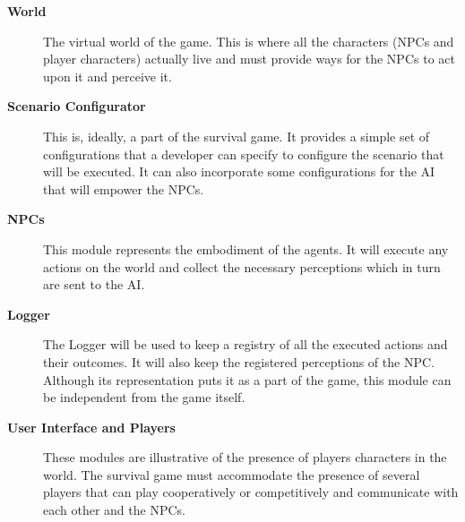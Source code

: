 \begin{description}
    \item[\textbf{World}] \hfill
    
    The virtual world of the game.
    This is where all the characters (\acp{NPC} and player characters) actually live and must provide ways for the \ac{NPC}s to act upon it and perceive it.

    \item[\textbf{Scenario Configurator}] \hfill
    
    This is, ideally, a part of the survival game.
    It provides a simple set of configurations that a developer can specify to configure the scenario that will be executed.
    It can also incorporate some configurations for the \ac{AI} that will empower the \acp{NPC}.
    
    \item[\textbf{NPCs}] \hfill
    
    This module represents the embodiment of the agents.
    It will execute any actions on the world and collect the necessary perceptions which in turn are sent to the \ac{AI}.
    
    \item[\textbf{Logger}] \hfill
    
    The Logger will be used to keep a registry of all the executed actions and their outcomes.
    It will also keep the registered perceptions of the \ac{NPC}.
    Although its representation puts it as a part of the game, this module can be independent from the game itself.
    
    \item[\textbf{User Interface and Players}]
    
    These modules are illustrative of the presence of players characters in the world.
    The survival game must accommodate the presence of several players that can play cooperatively or competitively and communicate with each other and the \acp{NPC}.
    
\end{description}


